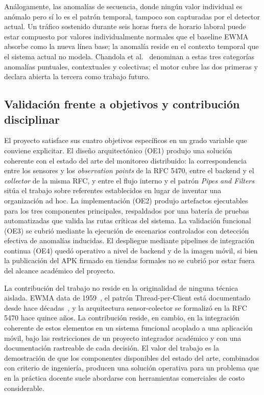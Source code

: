 Análogamente, las anomalías de secuencia, donde ningún valor 
individual es anómalo pero sí lo es el patrón temporal, tampoco 
son capturadas por el detector actual. Un tráfico sostenido durante 
seis horas fuera de horario laboral puede estar compuesto por 
valores individualmente normales que el baseline EWMA absorbe como 
la nueva línea base; la anomalía reside en el contexto temporal 
que el sistema actual no modela. Chandola et al.~\cite{chandola2009anomaly} 
denominan a estas tres categorías anomalías puntuales, 
contextuales y colectivas; el motor cubre las dos primeras y 
declara abierta la tercera como trabajo futuro.

\subsection{Validación frente a objetivos y contribución 
disciplinar}

El proyecto satisface sus cuatro objetivos específicos en un 
grado variable que conviene explicitar. El diseño arquitectónico 
(OE1) produjo una solución coherente con el estado del arte del 
monitoreo distribuido: la correspondencia entre los sensores y los 
\textit{observation points} de la RFC 5470, entre el backend y el 
\textit{collector} de la misma RFC\@, y entre el flujo interno y el 
patrón \textit{Pipes and Filters}~\cite{buschmann1996posa} sitúa 
el trabajo sobre referentes establecidos en lugar de inventar una 
organización ad hoc. La implementación (OE2) produjo artefactos 
ejecutables para los tres componentes principales, respaldados por 
una batería de pruebas automatizadas que valida las rutas críticas 
del sistema. La validación funcional (OE3) se cubrió mediante la 
ejecución de escenarios controlados con detección efectiva de 
anomalías inducidas. El despliegue mediante pipelines de 
integración continua (OE4) quedó operativo a nivel de backend y 
de la imagen móvil, si bien la publicación del APK firmado en 
tiendas formales no se cubrió por estar fuera del alcance 
académico del proyecto.

La contribución del trabajo no reside en la originalidad de 
ninguna técnica aislada. EWMA data de 1959~\cite{roberts1959ewma}, 
el patrón Thread-per-Client está documentado desde hace 
décadas~\cite{schmidt2000posa2}, y la arquitectura 
sensor-colector se formalizó en la RFC 5470 hace quince años. La 
contribución reside, en cambio, en la integración coherente de 
estos elementos en un sistema funcional acoplado a una aplicación 
móvil, bajo las restricciones de un proyecto integrador académico 
y con una documentación rastreable de cada decisión. El valor del 
trabajo es la demostración de que los componentes disponibles del 
estado del arte, combinados con criterio de ingeniería, producen 
una solución operativa para un problema que en la práctica 
docente suele abordarse con herramientas comerciales de costo 
considerable.

